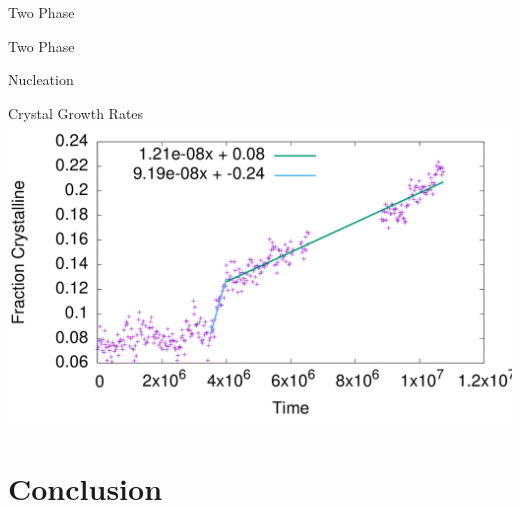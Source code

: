 \documentclass[16pt, aspectratio=43,compress]{beamer}
\begin{document}
\begin{frame}{Two Phase \tri}
    \noindent{}
    \noindent{}
\end{frame}

\begin{frame}{Two Phase \done}
    \noindent{}
    \noindent{}
\end{frame}

\begin{frame}{Nucleation}
    \vspace{-3pt}
\end{frame}

\begin{frame}{Crystal Growth Rates}
    \includegraphics[width=\linewidth]{crys_growth}
\end{frame}

\section{Conclusion}
\end{document}
